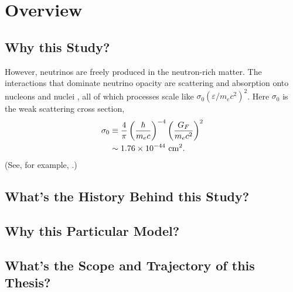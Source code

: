 \chapter{Overview}
\label{chap:overview}

\section{Why this Study?}

However, neutrinos are freely produced in the neutron-rich matter. The
interactions that dominate neutrino opacity are scattering and absorption onto
nucleons and nuclei \citep[Sec.\ 11.7]{shap1983-bh_wd_ns}, all of which processes
scale like $\sigma_0(\varepsilon/m_e c^2)^2$. Here $\sigma_0$ is the weak
scattering cross section,
\begin{align}
  \sigma_0
  &\equiv \frac{4}{\pi}\left(\frac{\hbar}{m_e c}\right)^{-4}
  \left(\frac{G_F}{m_e c^2}\right)^2 \\
  &\sim   1.76 \times 10^{-44} \,\, {\rm cm}^2.
\end{align}
(See, for example, \citealt{tubb1975-neutrino_opacities}.)

\section{What's the History Behind this Study?}

\section{Why this Particular Model?}

\section{What's the Scope and Trajectory of this Thesis?}
